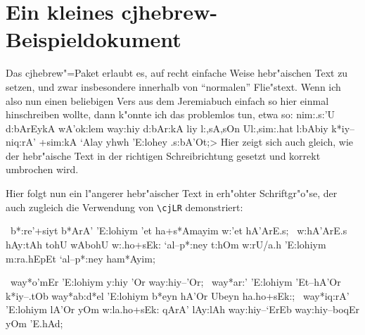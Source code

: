 \documentclass[a4paper]{article}
\newcommand{\cjh}{\textsf{cjhebrew}}
\begin{document}
\section*{Ein kleines \cjh-Beispieldokument}

Das \cjh"=Paket erlaubt es, auf recht einfache Weise hebr"aischen
Text zu setzen, und zwar insbesondere innerhalb von "`normalen"'
Flie"stext. Wenn ich also nun einen beliebigen Vers aus dem
Jeremiabuch einfach so hier einmal hinschreiben wollte, dann
k"onnte ich das problemlos tun, etwa so: \<nim:.s:'U d:bArEykA
wA'ok:lem way:hiy d:bAr:kA liy l:,sA,sOn Ul:,sim:.hat l:bAbiy
k*iy--niq:rA' +sim:kA `Alay yhwh 'E:lohey .s:bA'Ot;> Hier zeigt
sich auch gleich, wie der hebr"aische Text in der richtigen
Schreibrichtung gesetzt und korrekt umbrochen wird.

Hier folgt nun ein l"angerer hebr"aischer Text in erh"ohter
Schriftgr"o"se, der auch zugleich die Verwendung von \verb+\cjLR+
demonstriert:

\def\vers#1{\cjLR{\rmfamily\normalsize#1}}

\Large

\begin{cjhebrew}

\vers{1}~b*:re'+siyt b*ArA' 'E:lohiym 'et ha+s*Amayim w:'et
hA'ArE.s; \vers{2}~w:hA'ArE.s hAy:tAh tohU wAbohU w:.ho+sEk:
`al--p*:ney t:hOm w:rU/a.h 'E:lohiym m:ra.hEpEt `al--p*:ney
ham*Ayim;

\vers{3}~way*o'mEr 'E:lohiym y:hiy 'Or way:hiy--'Or;
\vers{4}~way*ar:' 'E:lohiym 'Et--hA'Or k*iy--.tOb way*ab:d*el
'E:lohiym b*eyn hA'Or Ubeyn ha.ho+sEk:; \vers{5}~way*iq:rA'
'E:lohiym lA'Or yOm w:la.ho+sEk: qArA' lAy:lAh way:hiy--`ErEb
way:hiy--boqEr yOm 'E.hAd;

\end{cjhebrew}
\end{document}
